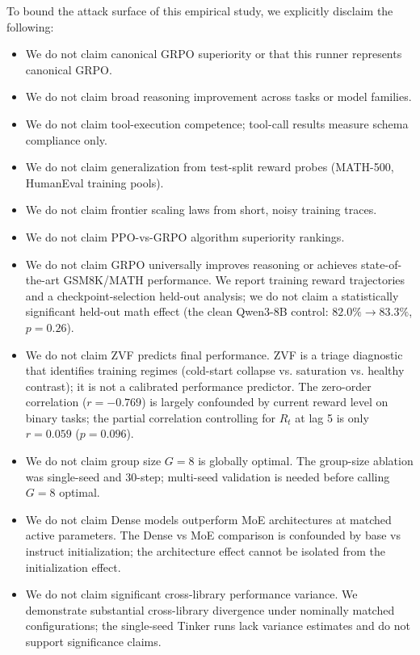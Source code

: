 \documentclass{article}
\begin{document}
To bound the attack surface of this empirical study, we explicitly disclaim the following:

\begin{itemize}
    \item We do not claim canonical GRPO superiority or that this runner represents canonical GRPO.
    \item We do not claim broad reasoning improvement across tasks or model families.
    \item We do not claim tool-execution competence; tool-call results measure schema compliance only.
    \item We do not claim generalization from test-split reward probes (MATH-500, HumanEval training pools).
    \item We do not claim frontier scaling laws from short, noisy training traces.
    \item We do not claim PPO-vs-GRPO algorithm superiority rankings.
    \item We do not claim GRPO universally improves reasoning or achieves state-of-the-art GSM8K/MATH performance. We report training reward trajectories and a checkpoint-selection held-out analysis; we do not claim a statistically significant held-out math effect (the clean Qwen3-8B control: $82.0\% \to 83.3\%$, $p=0.26$).
    \item We do not claim ZVF predicts final performance. ZVF is a triage diagnostic that identifies training regimes (cold-start collapse vs. saturation vs. healthy contrast); it is not a calibrated performance predictor. The zero-order correlation ($r = -0.769$) is largely confounded by current reward level on binary tasks; the partial correlation controlling for $R_t$ at lag 5 is only $r = 0.059$ ($p = 0.096$).
    \item We do not claim group size $G=8$ is globally optimal. The group-size ablation was single-seed and 30-step; multi-seed validation is needed before calling $G=8$ optimal.
    \item We do not claim Dense models outperform MoE architectures at matched active parameters. The Dense vs MoE comparison is confounded by base vs instruct initialization; the architecture effect cannot be isolated from the initialization effect.
    \item We do not claim significant cross-library performance variance. We demonstrate substantial cross-library divergence under nominally matched configurations; the single-seed Tinker runs lack variance estimates and do not support significance claims.
\end{itemize}
\end{document}
